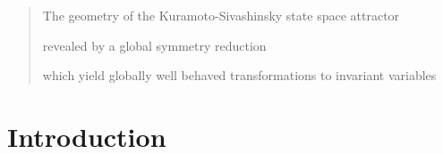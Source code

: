 \documentclass[aip,cha,showpacs,reprint]{revtex4-1} %
\begin{document}
\maketitle


\begin{quotation}
The geometry of the Kuramoto-Sivashinsky state space attractor

revealed by a global symmetry reduction

which yield {globally} well behaved
transformations to invariant variables

\end{quotation}

\section{Introduction\label{s:intro}}
\end{document}
